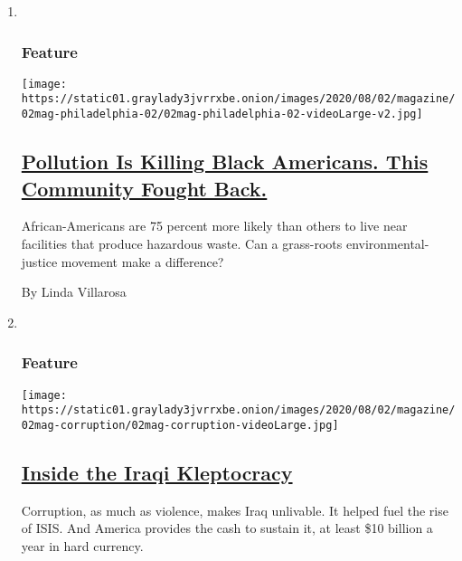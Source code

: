\begin{enumerate}
\def\labelenumi{\arabic{enumi}.}
\item ~
  \hypertarget{feature-1}{%
  \subsubsection{Feature}\label{feature-1}}

  \texttt{[image: https://static01.graylady3jvrrxbe.onion/images/2020/08/02/magazine/02mag-philadelphia-02/02mag-philadelphia-02-videoLarge-v2.jpg]}

  \hypertarget{pollution-is-killing-black-americans-this-community-fought-back}{%
  \subsection{\texorpdfstring{\href{/2020/07/28/magazine/pollution-philadelphia-black-americans.html}{Pollution
  Is Killing Black Americans. This Community Fought
  Back.}}{Pollution Is Killing Black Americans. This Community Fought Back.}}\label{pollution-is-killing-black-americans-this-community-fought-back}}

  African-Americans are 75 percent more likely than others to live near
  facilities that produce hazardous waste. Can a grass-roots
  environmental-justice movement make a difference?

  By Linda Villarosa
\item ~
  \hypertarget{feature-2}{%
  \subsubsection{Feature}\label{feature-2}}

  \texttt{[image: https://static01.graylady3jvrrxbe.onion/images/2020/08/02/magazine/02mag-corruption/02mag-corruption-videoLarge.jpg]}

  \hypertarget{inside-the-iraqi-kleptocracy}{%
  \subsection{\texorpdfstring{\href{/2020/07/29/magazine/iraq-corruption.html}{Inside
  the Iraqi
  Kleptocracy}}{Inside the Iraqi Kleptocracy}}\label{inside-the-iraqi-kleptocracy}}

  Corruption, as much as violence, makes Iraq unlivable. It helped fuel
  the rise of ISIS. And America provides the cash to sustain it, at
  least \$10 billion a year in hard currency.


\end{enumerate}
